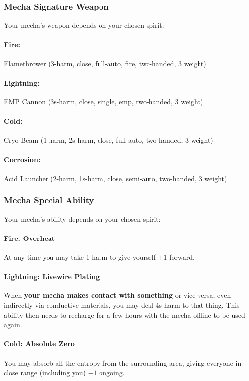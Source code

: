 \subsubsection{Mecha Signature Weapon}
Your mecha's weapon depends on your chosen spirit:
\paragraph{Fire:} Flamethrower (3-harm, close, full-auto, fire, two-handed, 3 weight)
\paragraph{Lightning:} EMP Cannon (3s-harm, close, single, emp, two-handed, 3 weight)
\paragraph{Cold:} Cryo Beam (1-harm, 2s-harm, close, full-auto, two-handed, 3 weight)
\paragraph{Corrosion:} Acid Launcher (2-harm, 1s-harm, close, semi-auto, two-handed, 3 weight)

\subsubsection{Mecha Special Ability}
Your mecha's ability depends on your chosen spirit:

\paragraph{Fire: Overheat}
At any time you may take 1-harm to give yourself $+1$ forward.

\paragraph{Lightning: Livewire Plating}
When \textbf{your mecha makes contact with something} or vice versa,
even indirectly via conductive materials, you may deal 4s-harm to that
thing. This ability then needs to recharge for a few hours with the
mecha offline to be used again.


\paragraph{Cold: Absolute Zero}
You may absorb all the entropy from the surrounding area, giving
everyone in close range (including you) $-1$ ongoing.

